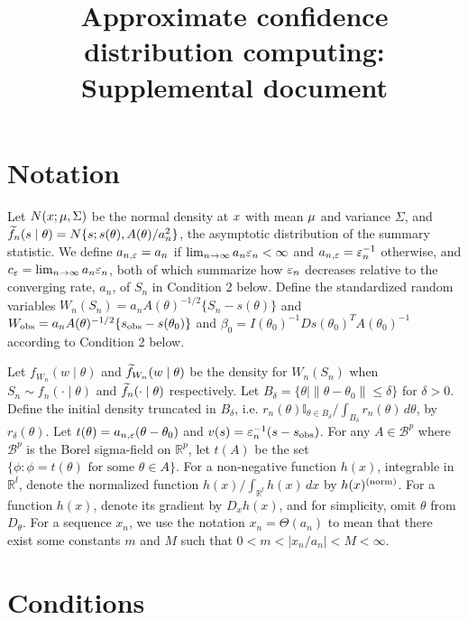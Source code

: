 \documentclass[9pt]{article}
\title{Approximate confidence distribution computing: Supplemental document}
\author{}
\date{}
\theoremstyle{remark}
\newcommand{\ST}[1]{{\color{blue}{#1}}}
\begin{document}
\maketitle


\section{Notation}
Let $N({}{x};{}{\mu},\Sigma)$ be the normal density at ${}{x}$
with mean ${}{\mu}$ and variance $\Sigma$, and $\widetilde{f}_{n}({}{s}\mid{}{\theta})=N\{{}{s};{}{s}({}{\theta}),A({}{\theta})/a_{n}^{2}\}$, the asymptotic distribution of the summary statistic.
We define $a_{n,\varepsilon}=a_{n}$ if $\lim_{n\rightarrow\infty}a_{n}\varepsilon_{n}<\infty$
and $a_{n,\varepsilon}=\varepsilon_{n}^{-1}$ otherwise, and $c_{\varepsilon}=\lim_{n\rightarrow\infty}a_{n}\varepsilon_{n}$,
both of which summarize how $\varepsilon_{n}$ decreases relative to the
converging rate, $a_{n}$, of $S_{n}$ in Condition 2 below. Define
the standardized random variables $W_{n}(S_{n})=a_{n}A(\theta)^{-1/2}\{S_{n}-s(\theta)\}$
and $W_{\rm obs}=a_{n}A(\theta)^{-1/2}\{s_{\rm obs}-s(\theta_0)\}$ and $\beta_{0}=I(\theta_0)^{-1}Ds(\theta_0)^{T}A(\theta_0)^{-1}$ according to Condition 2 below. 

Let $f_{W_{n}}(w\mid\theta)$ and
$\widetilde{f}_{W_{n}}(w\mid\theta)$ be the density for $W_{n}(S_{n})$ when
$S_{n}\sim f_{n}(\cdot\mid\theta)$ and $\widetilde{f}_n(\cdot\mid\theta)$ respectively.
Let $B_{\delta}=\{\theta\mid\|\theta-\theta_{0}\|\leq\delta\}$ for
$\delta>0$. Define the initial density truncated in $B_{\delta}$,
i.e. $r_{n}(\theta)\mathbb{I}_{\theta\in B_{\delta}}/\int_{B_{\delta}}r_{n}(\theta)\,d\theta$,
by $r_{\delta}(\theta)$. Let $t(\theta)=a_{n,\varepsilon}(\theta-\theta_{0})$
and $v(s)=\varepsilon_{n}^{-1}(s - s_{\rm obs})$. For any $A\in\mathscr{B}^{p}$
where $\mathscr{B}^{p}$ is the Borel sigma-field on $\mathbb{R}^{p}$,
let $t(A)$ be the set $\{\phi:\phi=t(\theta)\text{ for some }\theta\in A\}$.
For a non-negative function $h(x)$, integrable in $\mathbb{R}^{l}$,
denote the normalized function $h(x)/\int_{\mathbb{R}^{l}}h(x)\,dx$
by $h(x)^{({\rm norm})}$. For a function $h(x)$, denote its gradient
by $D_{x}h(x)$, and for simplicity, omit $\theta$ from $D_{\theta}$. For a sequence $x_n$, we use the notation $x_n = \Theta(a_n)$ to mean that there exist some constants $m$ and $M$ such that $0<m<\mid x_n/a_n \mid<M<\infty$.


\section{Conditions}
\end{document}
